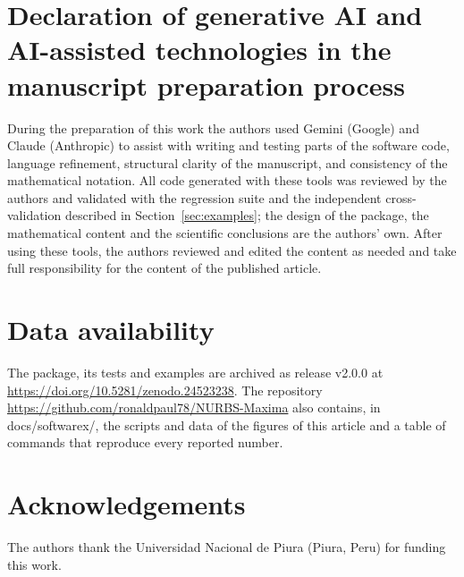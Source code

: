 \documentclass[preprint,12pt]{elsarticle}
\newcommand{\code}[1]{{\ttfamily\def\_{\textunderscore\allowbreak}#1}}
\begin{document}
\section*{Declaration of generative AI and AI-assisted technologies in the manuscript preparation process}
During the preparation of this work the authors used Gemini (Google) and Claude (Anthropic) to assist with writing and testing parts of the software code, language refinement, structural clarity of the manuscript, and consistency of the mathematical notation. All code generated with these tools was reviewed by the authors and validated with the regression suite and the independent cross-validation described in Section~\ref{sec:examples}; the design of the package, the mathematical content and the scientific conclusions are the authors' own. After using these tools, the authors reviewed and edited the content as needed and take full responsibility for the content of the published article.

\section*{Data availability}
The package, its tests and examples are archived as release v2.0.0 at \url{https://doi.org/10.5281/zenodo.24523238}. The repository \url{https://github.com/ronaldpaul78/NURBS-Maxima} also contains, in \code{docs/softwarex/}, the scripts and data of the figures of this article and a table of commands that reproduce every reported number.

\section*{Acknowledgements}
The authors thank the Universidad Nacional de Piura (Piura, Peru) for funding this work.



\end{document}
